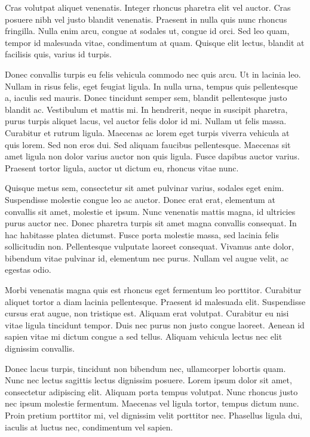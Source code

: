 Cras volutpat aliquet venenatis. Integer rhoncus pharetra elit vel auctor. Cras posuere nibh vel justo blandit venenatis. Praesent in nulla quis nunc rhoncus fringilla. Nulla enim arcu, congue at sodales ut, congue id orci. Sed leo quam, tempor id malesuada vitae, condimentum at quam. Quisque elit lectus, blandit at facilisis quis, varius id turpis.

Donec convallis turpis eu felis vehicula commodo nec quis arcu. Ut in lacinia leo. Nullam in risus felis, eget feugiat ligula. In nulla urna, tempus quis pellentesque a, iaculis sed mauris. Donec tincidunt semper sem, blandit pellentesque justo blandit ac. Vestibulum et mattis mi. In hendrerit, neque in suscipit pharetra, purus turpis aliquet lacus, vel auctor felis dolor id mi. Nullam ut felis massa. Curabitur et rutrum ligula. Maecenas ac lorem eget turpis viverra vehicula at quis lorem. Sed non eros dui. Sed aliquam faucibus pellentesque. Maecenas sit amet ligula non dolor varius auctor non quis ligula. Fusce dapibus auctor varius. Praesent tortor ligula, auctor ut dictum eu, rhoncus vitae nunc.

Quisque metus sem, consectetur sit amet pulvinar varius, sodales eget enim. Suspendisse molestie congue leo ac auctor. Donec erat erat, elementum at convallis sit amet, molestie et ipsum. Nunc venenatis mattis magna, id ultricies purus auctor nec. Donec pharetra turpis sit amet magna convallis consequat. In hac habitasse platea dictumst. Fusce porta molestie massa, sed lacinia felis sollicitudin non. Pellentesque vulputate laoreet consequat. Vivamus ante dolor, bibendum vitae pulvinar id, elementum nec purus. Nullam vel augue velit, ac egestas odio.

Morbi venenatis magna quis est rhoncus eget fermentum leo porttitor. Curabitur aliquet tortor a diam lacinia pellentesque. Praesent id malesuada elit. Suspendisse cursus erat augue, non tristique est. Aliquam erat volutpat. Curabitur eu nisi vitae ligula tincidunt tempor. Duis nec purus non justo congue laoreet. Aenean id sapien vitae mi dictum congue a sed tellus. Aliquam vehicula lectus nec elit dignissim convallis.

Donec lacus turpis, tincidunt non bibendum nec, ullamcorper lobortis quam. Nunc nec lectus sagittis lectus dignissim posuere. Lorem ipsum dolor sit amet, consectetur adipiscing elit. Aliquam porta tempus volutpat. Nunc rhoncus justo nec ipsum molestie fermentum. Maecenas vel ligula tortor, tempus dictum nunc. Proin pretium porttitor mi, vel dignissim velit porttitor nec. Phasellus ligula dui, iaculis at luctus nec, condimentum vel sapien.

